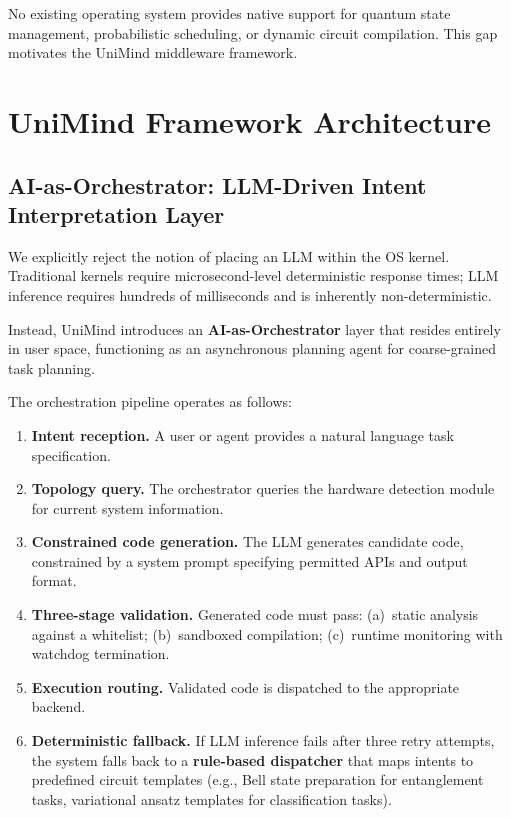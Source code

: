 ﻿\documentclass[12pt,a4paper]{article}
\begin{document}
No existing operating system provides native support for quantum state management, probabilistic scheduling, or dynamic circuit compilation. This gap motivates the UniMind middleware framework.


\section{UniMind Framework Architecture}\label{sec:architecture}

\subsection{AI-as-Orchestrator: LLM-Driven Intent Interpretation Layer}\label{sec:orchestrator}

We explicitly reject the notion of placing an LLM within the OS kernel. Traditional kernels require microsecond-level deterministic response times; LLM inference requires hundreds of milliseconds and is inherently non-deterministic.

Instead, UniMind introduces an \textbf{AI-as-Orchestrator} layer that resides entirely in user space, functioning as an asynchronous planning agent for coarse-grained task planning.

The orchestration pipeline operates as follows:

\begin{enumerate}[leftmargin=2em]
    \item \textbf{Intent reception.} A user or agent provides a natural language task specification.
    \item \textbf{Topology query.} The orchestrator queries the hardware detection module for current system information.
    \item \textbf{Constrained code generation.} The LLM generates candidate code, constrained by a system prompt specifying permitted APIs and output format.
    \item \textbf{Three-stage validation.} Generated code must pass: (a)~static analysis against a whitelist; (b)~sandboxed compilation; (c)~runtime monitoring with watchdog termination.
    \item \textbf{Execution routing.} Validated code is dispatched to the appropriate backend.
    \item \textbf{Deterministic fallback.} If LLM inference fails after three retry attempts, the system falls back to a \textbf{rule-based dispatcher} that maps intents to predefined circuit templates (e.g., Bell state preparation for entanglement tasks, variational ansatz templates for classification tasks).
\end{enumerate}
\end{document}
